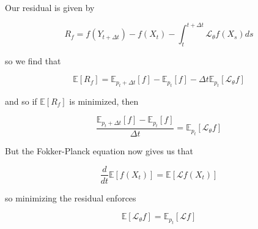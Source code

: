 \documentclass[12pt]{article}
\theoremstyle{break}
\begin{document}
Our residual is given by

\begin{equation}
	R_f = f(Y_{t + \Delta t}) - f(X_t) - \int_t^{t+\Delta t}\mathcal{L_\theta}f(X_s)ds
\end{equation}

so we find that

\begin{equation}
	\mathbb{E}[R_f] = \mathbb{E}_{p_t + \Delta t}[f] - \mathbb{E}_{p_t}[f] - \Delta t \mathbb{E}_{p_t}[\mathcal{L}_\theta f]
\end{equation}

and so if $\mathbb{E}[R_f]$ is minimized, then 

\begin{equation}
	\frac{\mathbb{E}_{p_t + \Delta t}[f] - \mathbb{E}_{p_t}[f]}{\Delta t} = \mathbb{E}_{p_t}[\mathcal{L}_\theta f]
\end{equation}

But the Fokker-Planck equation now gives us that

\begin{equation}
	\frac{d}{dt}\mathbb{E}[f(X_t)] = \mathbb{E}[\mathcal{L}f(X_t)]
\end{equation}

so minimizing the residual enforces

\begin{equation}
	\mathbb{E}[\mathcal{L}_\theta f] = \mathbb{E}_{p_t}[\mathcal{L}f]
\end{equation}
\end{document}

